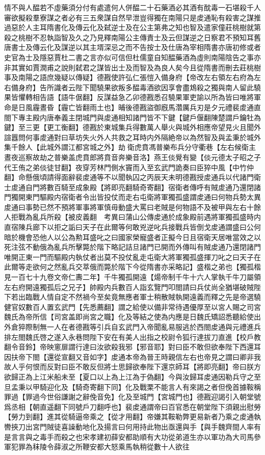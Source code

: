 情不與人醖若不虛藥須分付有處遣何人併醖二十石藥酒必其酒有酖毒一石堪殺千人審欲擬殺羣寮謀之者必有三五衆謀自然早泄豈得獨在南陽只是䖍通恥有殺害之謀推過惡於人主耳隋書化及傳云化及弑逆士及在公主第弗之知也智及遣家僮莊桃樹就第殺之桃樹不忍執詣智及久之乃見釋南陽公主傳責士及云但謀逆之日察君不預知耳舊唐書士及傳云化及謀逆以其主壻深忌之而不告按士及仕唐為宰相隋書亦唐初修或者史官為士及隱惡賈杜二書之言亦似可信但杜儒童自知醖藥酒為虛則南陽陰告之事亦非其實如賈潤甫之說則弑君之謀皆出士及而智及為良人矣今且從隋書而刪去莊桃樹事及南陽之語庶幾疑以傳疑】德戡使許弘仁張愷入備身府【帝改左右領左右府為左右備身府】告所識者云陛下聞驍果欲叛多醖毒酒欲因享會盡鴆殺之獨與南人留此驍果皆懼轉相告語【語牛倨翻】反謀益急乙卯德戡悉召驍果軍吏諭以所為皆曰唯將軍命是日風霾晝昏【霾亡皆翻雨土也】晡後德戡盜御廐馬濳厲兵刃是夕元禮裴䖍通直閤下專主殿内唐奉義主閉城門與䖍通相知諸門皆不下鍵【鍵戶偃翻陳楚謂戶鑰牡為鍵】至三更【更工衡翻】德戡於東城集兵得數萬人舉火與城外相應帝望見火且聞外諠囂問何事䖍通對曰草坊失火外人共救之耳時内外隔絶帝以為然智及與孟秉於城外集千餘人【此城外謂江都宮城之外】劫衛虎賁馮普樂布兵分守衢巷【左右候衛主晝夜巡察故劫之普樂盖虎賁郎將賁音奔樂音洛】燕王倓覺有變【倓元德太子昭之子代王侑之弟倓徒甘翻】夜穿芳林門側水竇而入至玄武門詭奏曰臣猝中風【中竹仲翻】命懸俄頃請得面辭裴䖍通等不以聞執囚之丙辰天未明德戡授䖍通兵以代諸門衛士䖍通自門將數百騎至成象殿【將即亮翻騎奇寄翻】宿衛者傳呼有賊䖍通乃還閉諸門獨開東門驅殿内宿衛者令出皆投仗而走右屯衛將軍獨孤盛謂䖍通曰何物兵勢太異䖍通曰事勢已然不預將軍事將軍慎毋動盛大罵曰老賊是何物語不及被甲與左右十餘人拒戰為亂兵所殺【被皮義翻　考異曰蒲山公傳䖍通於成象殿前遇將軍獨孤盛時内直宿陳兵廊下以拒之詬曰天子在此爾等何敢兇逆叱兵接戰兵皆倒戈䖍通謂盛曰公何暗於機會恐他人以公為勲耳盛叱之曰國家榮寵盛者正擬今日且宿衛天居唯當效之以死注弦不動俄為亂兵所擊斃於階下略記詰旦諸門已開而外傳叫有賊䖍通乃還閉諸門唯開正東一門而驅殿内執仗者出莫不投仗亂走屯衛大將軍獨孤盛揮刀叱之曰天子在此爾等走欲何之然亂兵交萃俄而斃於階下今從隋書亦采略記】盛楷之弟也【獨孤楷見一百七十九卷文帝仁夀二年】千牛獨孤開遠【煬帝制千牛十六人掌執千牛刀屬領左右府開遠獨孤后之兄子】帥殿内兵數百人詣玄覽門叩閤請曰兵仗尚全猶堪破賊陛下若出臨戰人情自定不然禍今至矣竟無應者軍士稍散賊執開遠義而釋之先是帝選驍健官奴數百人置玄武門【先悉薦翻】謂之給使以備非常待遇優厚至以宮人賜之司宮魏氏為帝所信【司宮盖即尚宮之職】化及等結之使為内應是日魏氏矯詔悉聽給使出外倉猝際制無一人在者德戡等引兵自玄武門入帝聞亂易服逃於西閤䖍通與元禮進兵排左閤魏氏啓之遂入永巷問陛下安在有美人出指之校尉令狐行達拔刀直進【校戶教翻令音鈴】帝映窻扉謂行達曰汝欲殺我邪【邪音耶】對曰臣不敢但欲奉陛下西還耳因扶帝下閤【還從宣翻又音如字】䖍通本帝為晉王時親信左右也帝見之謂曰卿非我故人乎何恨而反對曰臣不敢反但將士思歸欲奉陛下還京師耳【將即亮翻】帝曰朕方欲歸正為上江米船未至【夏口以上為上江為于偽翻】今與汝歸耳䖍通因勒兵守之至旦孟秉以甲騎迎化及【騎奇寄翻下同】化及戰栗不能言人有來謁之者但俛首據鞍稱罪過【罪過今世俗謙謝之辭俛音免】化及至城門【宮城門也】德戡迎謁引入朝堂號爲丞相【朝直遥翻下同號戶刀翻呼也】裴䖍通謂帝曰百官悉在朝堂陛下須親出慰勞【勞力到翻】進其從騎逼帝乘之【從才用翻】帝嫌其鞍勒弊更易新者乃乘之䖍通執轡挾刀出宮門賊徒喜譟動地化及揚言曰何用持此物出亟還與手【與手魏齊間人率有是言言與之毒手而殺之也宋孝建初薛安都助順有大功從弟道生亦以軍功為大司馬參軍犯罪為秣陵令薛淑之所鞭安都大怒乘馬執稍從數十人欲往